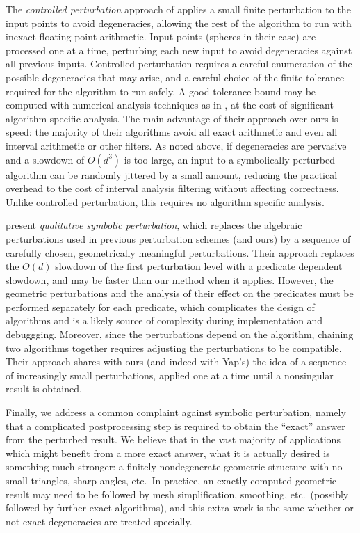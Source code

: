 \documentclass[11pt]{article}
\begin{document}
The \emph{controlled perturbation} approach of \cite{halperin1998perturbation} applies a small finite perturbation to the input points to avoid degeneracies, allowing the rest
of the algorithm to run with inexact floating point arithmetic.  Input points (spheres in their case) are processed one at a time, perturbing each new input to avoid degeneracies
against all previous inputs.  Controlled perturbation requires a careful enumeration of the possible degeneracies that may arise, and a careful choice of the finite tolerance
required for the algorithm to run safely.  A good tolerance bound may be computed with numerical analysis techniques as in \cite{halperin2004controlled}, at the cost of significant
algorithm-specific analysis.  The main advantage of their approach over ours is speed: the majority of their algorithms avoid all exact arithmetic and even all interval arithmetic
or other filters.  As noted above, if degeneracies are pervasive and a slowdown of $O(d^3)$ is too large, an input to a symbolically perturbed algorithm can be randomly
jittered by a small amount, reducing the practical overhead to the cost of interval analysis filtering without affecting correctness.  Unlike controlled perturbation, this requires
no algorithm specific analysis.

\cite{devillers2012qualitative} present \emph{qualitative symbolic perturbation}, which replaces the algebraic perturbations used in previous perturbation schemes (and ours)
by a sequence of carefully chosen, geometrically meaningful perturbations.  Their approach replaces the $O(d)$ slowdown of the first perturbation level with a predicate dependent
slowdown, and may be faster than our method when it applies.  However, the geometric perturbations and the analysis of their effect on the predicates must be performed separately for each
predicate, which complicates the design of algorithms and is a likely source of complexity during implementation and debuggging.  Moreover, since the perturbations depend on the
algorithm, chaining two algorithms together requires adjusting the perturbations to be compatible.  Their approach shares with ours (and indeed
with Yap's) the idea of a sequence of increasingly small perturbations, applied one at a time until a nonsingular result is obtained.

Finally, we address a common complaint against symbolic perturbation, namely that a complicated postprocessing step is required to obtain the ``exact'' answer from the
perturbed result.  We believe that in the vast majority of applications which might benefit from a more exact answer, what it is actually desired is something much
stronger: a finitely nondegenerate geometric structure with no small triangles, sharp angles, etc.\  In practice, an exactly computed geometric result may need to
be followed by mesh simplification, smoothing, etc.\ (possibly followed by further exact algorithms), and this extra work is the same whether or not exact degeneracies are
treated specially.
\end{document}
